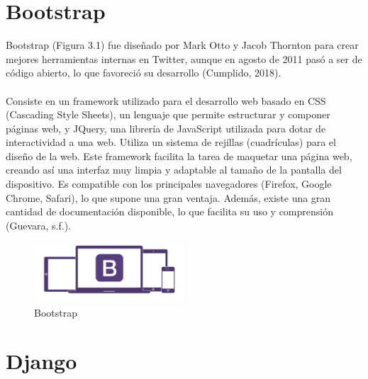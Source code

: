 \documentclass{report}
\begin{document}
\section{Bootstrap}

Bootstrap (Figura 3.1) fue diseñado por Mark Otto y Jacob Thornton para crear mejores herramientas internas en Twitter, aunque en agosto de 2011 pasó a ser de código abierto, lo que favoreció su desarrollo (Cumplido, 2018).
\\
\\
Consiste en un framework utilizado para el desarrollo web basado en CSS (Cascading Style Sheets), un lenguaje que permite estructurar y componer páginas web, y JQuery, una librería de JavaScript utilizada para dotar de interactividad a una web. Utiliza un sistema de rejillas (cuadrículas) para el diseño de la web. Este framework facilita la tarea de maquetar una página web, creando así una interfaz muy limpia y adaptable al tamaño de la pantalla del dispositivo. Es compatible con los principales navegadores (Firefox, Google Chrome, Safari), lo que supone una gran ventaja. Además, existe una gran cantidad de documentación disponible, lo que facilita su uso y comprensión (Guevara, s.f.).
\\
\begin{figure}[h!]
  \centering
    \includegraphics[width=0.5\textwidth]{images/bootstrap.png}
  \caption{Bootstrap}
  \label{Bootstrap}
\end{figure}

\section{Django}
\end{document}
